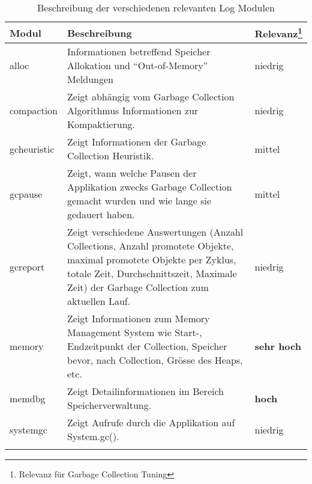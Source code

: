 \begin{longtable}{|p{4cm}|p{9cm}|p{2cm}|}
  \hline
  \textbf{Modul} & \textbf{Beschreibung} & \textbf{Relevanz\footnote{Relevanz für Garbage Collection Tuning}}\\\hline
  alloc & Informationen betreffend Speicher Allokation und ``Out-of-Memory'' Meldungen & niedrig \\\hline
  compaction & Zeigt abhängig vom Garbage Collection Algorithmus Informationen zur Kompaktierung.& niedrig \\\hline
  gcheuristic & Zeigt Informationen der Garbage Collection Heuristik. & mittel \\\hline
  gcpause & Zeigt, wann welche Pausen der Applikation zwecks Garbage Collection gemacht wurden und wie lange sie gedauert haben. & mittel \\\hline
  gcreport & Zeigt verschiedene Auswertungen (Anzahl Collections, Anzahl promotete Objekte, maximal promotete Objekte per Zyklus, totale Zeit, Durchschnittszeit, Maximale Zeit) der Garbage Collection zum aktuellen Lauf.& niedrig \\\hline
  memory & Zeigt Informationen zum Memory Management System wie Start-, Endzeitpunkt der Collection, Speicher bevor, nach Collection, Grösse des Heaps, etc.& \textbf{sehr hoch} \\\hline
  memdbg & Zeigt Detailinformationen im Bereich Speicherverwaltung.& \textbf{hoch} \\\hline
  systemgc & Zeigt Aufrufe durch die Applikation auf System.gc(). & niedrig \\\hline
    \caption{Beschreibung der verschiedenen relevanten Log Modulen}
\end{longtable}